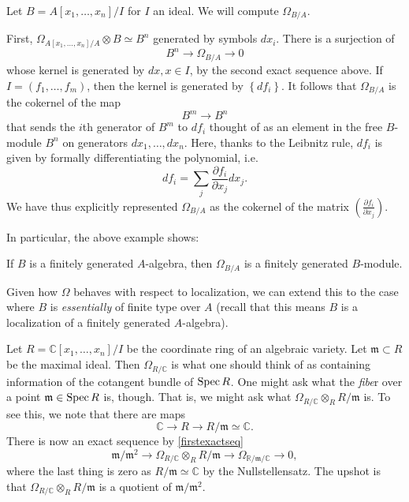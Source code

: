 \begin{example} 
Let $B = A[x_1, \dots, x_n]/I$ for $I$ an ideal. We will compute $\Omega_{B/A}$.

First, $\Omega_{A[x_1, \dots, x_n]/A} \otimes B \simeq B^n$ generated by
symbols $dx_i$. There is a surjection of
\[ B^n \to \Omega_{B/A} \to 0  \]
whose kernel is generated by $dx, x \in I$, by the second exact sequence above.
If $I = (f_1, \dots, f_m)$, then the kernel is generated by 
$\left\{df_i\right\}$.
It follows that $\Omega_{B/A}$ is the cokernel of the map
\[ B^m \to B^n  \]
that sends the $i$th generator of $B^m$ to $df_i$ thought of as an element in
the free $B$-module $B^n$ on generators $dx_1, \dots, dx_n$. Here, thanks to
the Leibnitz rule, $df_i$ is
given by formally differentiating the polynomial, i.e.
\[ df_i = \sum_j \frac{\partial f_i}{\partial x_j} dx_j. \] We have thus
explicitly represented $\Omega_{B/A}$ as the cokernel of the matrix $\left(
\frac{\partial f_i}{\partial x_j}\right)$.
\end{example} 

In particular, the above example shows:
\begin{proposition} 
If $B$ is a finitely generated $A$-algebra, then $\Omega_{B/A}$ is a finitely
generated $B$-module.
\end{proposition} 
Given how $\Omega$ behaves with respect to localization, we can extend this to
the case where $B$ is \emph{essentially} of finite type over $A$ (recall that
this means $B$ is a localization of a finitely generated $A$-algebra).

Let $R = \mathbb{C}[x_1, \dots, x_n]/I$ be the coordinate ring of an algebraic
variety. Let $\mathfrak{m} \subset R$ be the maximal ideal. Then 
$\Omega_{R/\mathbb{C}}$ is what one should think of as containing information
of the cotangent bundle of $\operatorname{Spec} R$. One might ask what the \emph{fibe}r over a point
$\mathfrak{m} \in \operatorname{Spec} R$ is, though. That is, we might ask what
\( \Omega_{R/\mathbb{C}} \otimes_R R/\mathfrak{m}  \)
is. To see this, we note that there are maps
\[ \mathbb{C} \to R \to R/\mathfrak{m} \simeq \mathbb{C}.  \]
There is now an exact sequence by 
\cref{firstexactseq}
\[ \mathfrak{m}/\mathfrak{m}^2 \to \Omega_{R/\mathbb{C}} \otimes_R
R/\mathfrak{m} \to \Omega_{\mathbb{R}/\mathfrak{m}/\mathbb{C}} \to 0,  \]
where the last thing is zero as $R/\mathfrak{m} \simeq \mathbb{C} $ by the
Nullstellensatz.
The upshot is that $\Omega_{R/\mathbb{C}} \otimes_R R/\mathfrak{m}$ is a
quotient of $\mathfrak{m}/\mathfrak{m}^2$. 

